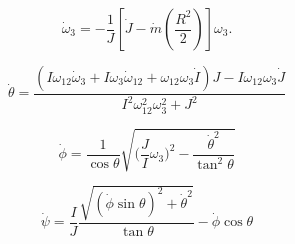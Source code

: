 \begin{equation}
    \label{13}
    \dot{\omega}_3 = - \frac{1}{J}[\dot{J} - \dot{m}(\frac{R^2}{2})] \omega_3.
\end{equation}


\begin{equation}
\label{eq_euler_angles_dot_theta_final}
\dot{\theta} = \frac{\left(I \omega_{12} \dot{\omega}_3 + I \omega_3 \dot{\omega}_{12} + \omega_{12} \omega_3 \dot{I}\right) J - I \omega_{12} \omega_3 \dot{J}}{I^2 \omega_{12}^2 \omega_3^2 + J^2}
\end{equation}

\begin{equation}
\label{eq_euler_angles_dot_phi_final}
\dot{\phi} = \frac{1}{\cos\theta} \sqrt{\bigg(\frac{J}{I} \omega_3\bigg)^2 - \frac{\dot{\theta}^2}{\tan^2 \theta}}
\end{equation}

\begin{equation}
\label{eq_euler_angles_dot_psi_final}
\dot{\psi} = \frac{I}{J} \frac{\sqrt{(\dot{\phi} \sin \theta)^2 + \dot{\theta}^2}}{\tan \theta} - \dot{\phi} \cos \theta
\end{equation}


